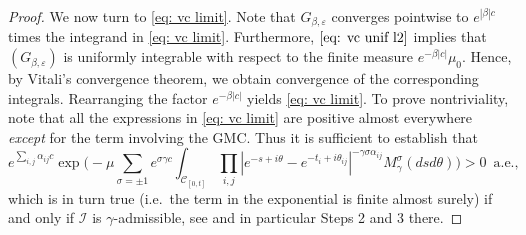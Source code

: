 \documentclass[11pt]{amsart}
\numberwithin{equation}{section}
\theoremstyle{definition}
\def\eps{\varepsilon}
\begin{document}
\begin{proof}
We now turn to \eqref{eq: vc limit}. Note that $G_{\beta,\eps}$ converges pointwise to $e^{|\beta| c}$ times the integrand in \eqref{eq: vc limit}. Furthermore, $\eqref{eq: vc unif l2}$ implies that $(G_{\beta,\eps})$ is uniformly integrable with respect to the finite measure $e^{-\beta|c|}\mu_0$.  Hence, by Vitali's convergence theorem, we obtain convergence of the corresponding integrals. Rearranging the factor $e^{-\beta|c|}$ yields \eqref{eq: vc limit}. To prove nontriviality, note that all the expressions in \eqref{eq: vc limit} are positive almost everywhere \emph{except} for the term involving the GMC. Thus it is sufficient to establish that
\begin{equation}
e^{\sum_{i,j} \alpha_{ij} c}\exp \big(-\mu \sum_{\sigma = \pm 1} e^{\sigma\gamma c} \int_{\mathcal{C}_{[0,t]}} \prod_{i,j} |e^{-s+i\theta}-e^{-t_i+i\theta_{ij}}|^{-\gamma \sigma \alpha_{ij}} M^\sigma_\gamma(dsd\theta)\big) > 0 \, \text{ a.e., }	
\end{equation}
which is in turn true (i.e.\ the term in the exponential is finite almost surely) if and only if $\mathcal I$ is $\gamma$-admissible, see \cite[Lemma 5.19]{Berestycki_lqggff} and in particular Steps 2 and 3 there.
\end{proof}
\end{document}
